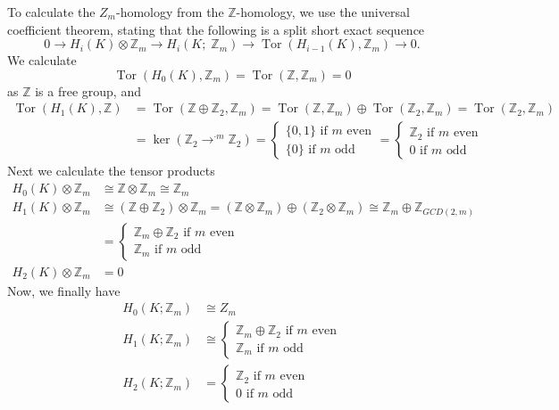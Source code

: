 \documentclass[a4paper, 12pt]{article}
\DeclareMathOperator{\Tor}{Tor}
\newcommand{\Z}{\mathbb{Z}}
\newcommand{\iso}{\cong}
\begin{document}
\begin{enumerate}
	To calculate the $Z_m$-homology from the $\Z$-homology, we use the universal coefficient theorem, stating that the following is a split short exact sequence
	\[
	0 \to H_i(K) \otimes \Z_m \to H_i(K;\; \Z_m) \to \Tor(H_{i-1}(K), \Z_m) \to 0.
	\]
	We calculate
	\[
	\Tor(H_0(K), \Z_m) = \Tor(\Z, \Z_m) = 0
	\] as $\Z$ is a free group, and
	\begin{align*}
	\Tor(H_1(K), \Z) &= \Tor(\Z\oplus\Z_2, \Z_m) = \Tor(\Z, \Z_m) \oplus \Tor(\Z_2, \Z_m) = \Tor(\Z_2, \Z_m) \\
	&= \ker(\Z_2 \to^{\cdot m} \Z_2) =
	\begin{cases}
	\lbrace 0, 1 \rbrace \text{ if $m$ even} \\
	\lbrace 0 \rbrace \text{ if $m$ odd}
	\end{cases}
	=
	\begin{cases}
	\Z_2 \text{ if $m$ even} \\
	0 \text{ if $m$ odd}
	\end{cases}
	\end{align*}
	Next we calculate the tensor products
	\begin{align*}
	H_0(K) \otimes \Z_m &\iso \Z \otimes \Z_m \iso \Z_m \\
	H_1(K) \otimes \Z_m &\iso (\Z \oplus \Z_2) \otimes \Z_m = (\Z \otimes \Z_m) \oplus (\Z_2 \otimes \Z_m)
	\iso \Z_m \oplus \Z_{GCD(2, m)} \\
	&=
	\begin{cases}
	\Z_m \oplus \Z_2  \text{ if $m$ even} \\
	\Z_m \text{ if $m$ odd}
	\end{cases} \\
	H_2(K) \otimes \Z_m &= 0
	\end{align*}
	Now, we finally have
	\begin{align*}
	H_0(K;\Z_m) &\iso Z_m\\
	H_1(K;\Z_m) &\iso
	\begin{cases}
	\Z_m \oplus \Z_2  \text{ if $m$ even} \\
	\Z_m \text{ if $m$ odd}
	\end{cases} \\
	H_2(K;\Z_m) &=
	\begin{cases}
	\Z_2 \text{ if $m$ even} \\
	0 \text{ if $m$ odd}
	\end{cases}
	\end{align*}
	

\end{enumerate}
\end{document}
